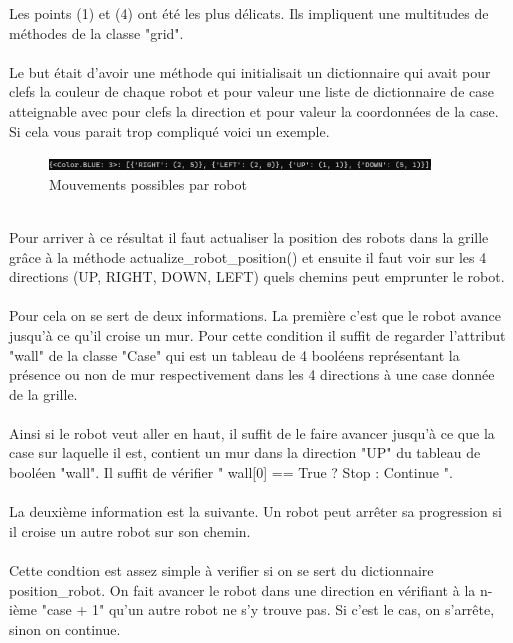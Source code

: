 \documentclass{article}
\begin{document}
Les points (1) et (4) ont été les plus délicats. Ils impliquent une multitudes de méthodes de la classe "grid".\\\\ Le but était d'avoir une méthode qui initialisait un dictionnaire qui avait pour clefs la couleur de chaque robot et pour valeur une liste de dictionnaire de case atteignable avec pour clefs la direction et pour valeur la coordonnées de la case. Si cela vous parait trop compliqué voici un exemple.
\begin{figure}[htbp]
  \centering  
  \includegraphics[width=0.9\textwidth]{possible_move.png}  
  \caption{Mouvements possibles par robot} 
  \label{fig:Mission}  
\end{figure}\\
Pour arriver à ce résultat il faut actualiser la position des robots dans la grille grâce à la méthode actualize\_robot\_position() et ensuite il faut voir sur les 4 directions (UP, RIGHT, DOWN, LEFT) quels chemins peut emprunter le robot.\\\\ 
Pour cela on se sert de deux informations. La première c'est que le robot avance jusqu'à ce qu'il croise un mur. Pour cette condition il suffit de regarder l'attribut "wall" de la classe "Case" qui est un tableau de 4 booléens représentant la présence ou non de mur respectivement dans les 4 directions à une case donnée de la grille.\\\\
Ainsi si le robot veut aller en haut, il suffit de le faire avancer jusqu'à ce que la case sur laquelle il est, contient un mur dans la direction "UP" du tableau de booléen "wall". Il suffit de vérifier  " wall[0] == True ? Stop : Continue ".\\\\
La deuxième information est la suivante. Un robot peut arrêter sa progression si il croise un autre robot sur son chemin.\\\\ Cette condtion est assez simple à verifier si on se sert du dictionnaire position\_robot. On fait avancer le robot dans une direction en vérifiant à la n-ième "case + 1" qu'un autre robot ne s'y trouve pas. Si c'est le cas, on s'arrête, sinon on continue. 
\end{document}
